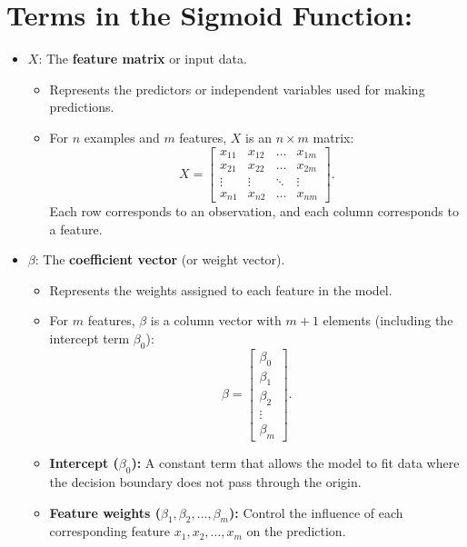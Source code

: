 \documentclass[10pt]{article}
\begin{document}
\section{Terms in the Sigmoid Function:}
\begin{itemize}
    \item \(X\): The \textbf{feature matrix} or input data.
    \begin{itemize}
        \item Represents the predictors or independent variables used for making predictions.
        \item For \(n\) examples and \(m\) features, \(X\) is an \(n \times m\) matrix:
        \[
        X = \begin{bmatrix}
        x_{11} & x_{12} & \dots & x_{1m} \\
        x_{21} & x_{22} & \dots & x_{2m} \\
        \vdots & \vdots & \ddots & \vdots \\
        x_{n1} & x_{n2} & \dots & x_{nm}
        \end{bmatrix}.
        \]
        Each row corresponds to an observation, and each column corresponds to a feature.
    \end{itemize}
    \item \(\beta\): The \textbf{coefficient vector} (or weight vector).
    \begin{itemize}
        \item Represents the weights assigned to each feature in the model.
        \item For \(m\) features, \(\beta\) is a column vector with \(m + 1\) elements (including the intercept term \(\beta_0\)):
        \[
        \beta = \begin{bmatrix}
        \beta_0 \\
        \beta_1 \\
        \beta_2 \\
        \vdots \\
        \beta_m
        \end{bmatrix}.
        \]
        \item \textbf{Intercept (\(\beta_0\)):} A constant term that allows the model to fit data where the decision boundary does not pass through the origin.
        \item \textbf{Feature weights (\(\beta_1, \beta_2, \dots, \beta_m\)):} Control the influence of each corresponding feature \(x_1, x_2, \dots, x_m\) on the prediction.
    \end{itemize}

\end{itemize}
\end{document}
